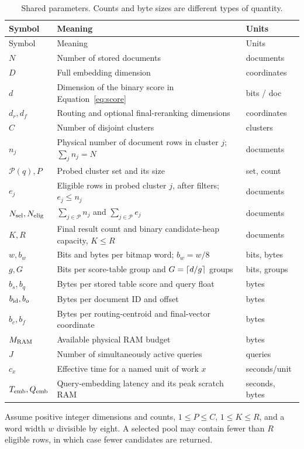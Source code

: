 \small
\begin{longtable}{@{}P{.17\linewidth}P{.64\linewidth}P{.13\linewidth}@{}}
\caption{Shared parameters. Counts and byte sizes are different types of quantity.}\label{tab:parameters}\\
\toprule Symbol & Meaning & Units\\\midrule\endfirsthead
\toprule Symbol & Meaning & Units\\\midrule\endhead
$N$ & Number of stored documents & documents\\
$D$ & Full embedding dimension & coordinates\\
$d$ & Dimension of the binary score in Equation~\eqref{eq:score} & bits / doc\\
$d_r,d_f$ & Routing and optional final-reranking dimensions & coordinates\\
$C$ & Number of disjoint clusters & clusters\\
$n_j$ & Physical number of document rows in cluster $j$; $\sum_j n_j=N$ & documents\\
$\mathcal P(q),P$ & Probed cluster set and its size & set, count\\
$e_j$ & Eligible rows in probed cluster $j$, after filters; $e_j\leq n_j$ & documents\\
$N_{\mathrm{sel}},N_{\mathrm{elig}}$ & $\sum_{j\in\mathcal P}n_j$ and $\sum_{j\in\mathcal P}e_j$ & documents\\
$K,R$ & Final result count and binary candidate-heap capacity, $K\leq R$ & documents\\
$w,b_w$ & Bits and bytes per bitmap word; $b_w=w/8$ & bits, bytes\\
$g,G$ & Bits per score-table group and $G=\left\lceil d/g\right\rceil$ groups & bits, groups\\
$b_s,b_q$ & Bytes per stored table score and query float & bytes\\
$b_{\rm id},b_o$ & Bytes per document ID and offset & bytes\\
$b_c,b_f$ & Bytes per routing-centroid and final-vector coordinate & bytes\\
$M_{\rm RAM}$ & Available physical RAM budget & bytes\\
$J$ & Number of simultaneously active queries & queries\\
$c_x$ & Effective time for a named unit of work $x$ & seconds/unit\\
$T_{\rm emb},Q_{\rm emb}$ & Query-embedding latency and its peak scratch RAM & seconds, bytes\\
\bottomrule
\end{longtable}
\normalsize
Assume positive integer dimensions and counts, $1\leq P\leq C$, $1\leq K\leq R$, and a word width $w$ divisible by eight. A selected pool may contain fewer than $R$ eligible rows, in which case fewer candidates are returned.

